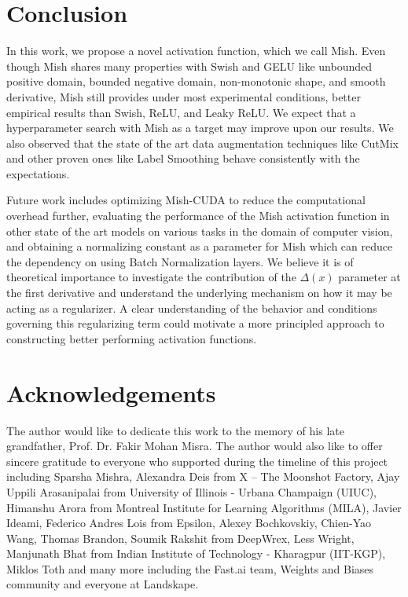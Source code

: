 \documentclass{bmvc2k}
\begin{document}
\section{Conclusion}

In this work, we propose a novel activation function, which we call Mish. Even though Mish shares many properties with Swish and GELU like unbounded positive domain, bounded negative domain, non-monotonic shape, and smooth derivative, Mish still provides under most experimental conditions, better empirical results than Swish, ReLU, and Leaky ReLU. We expect that a hyperparameter search with Mish as a target may improve upon our results. We also observed that the state of the art data augmentation techniques like CutMix and other proven ones like Label Smoothing behave consistently with the expectations. 

Future work includes optimizing Mish-CUDA to reduce the computational overhead further, evaluating the performance of the Mish activation function in other state of the art models on various tasks in the domain of computer vision, and obtaining a normalizing constant as a parameter for Mish which can reduce the dependency on using Batch Normalization layers. We believe it is of theoretical importance to investigate the contribution of the $\Delta(x)$ parameter at the first derivative and understand the underlying mechanism on how it may be acting as a regularizer. A clear understanding of the behavior and conditions governing this regularizing term could motivate a more principled approach to constructing better performing activation functions. 

\section{Acknowledgements}

The author would like to dedicate this work to the memory of his late grandfather, Prof. Dr. Fakir Mohan Misra. The author would also like to offer sincere gratitude to everyone who supported during the timeline of this project including Sparsha Mishra, Alexandra Deis from X – The Moonshot Factory, Ajay Uppili Arasanipalai from University of Illinois - Urbana Champaign (UIUC), Himanshu Arora from Montreal Institute for Learning Algorithms (MILA), Javier Ideami, Federico Andres Lois from Epsilon, Alexey Bochkovskiy, Chien-Yao Wang, Thomas Brandon, Soumik Rakshit from DeepWrex, Less Wright, Manjunath Bhat from Indian Institute of Technology - Kharagpur (IIT-KGP), Miklos Toth and many more including the Fast.ai team, Weights and Biases community and everyone at Landskape.


\end{document}

